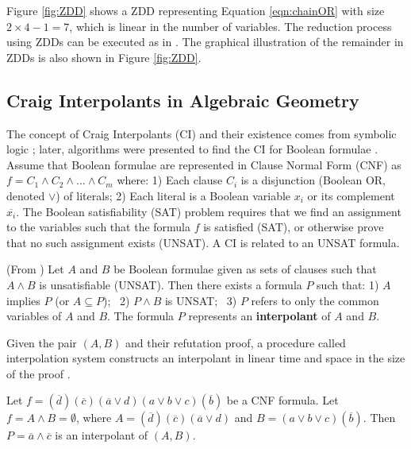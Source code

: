 Figure \ref{fig:ZDD} shows a ZDD representing 
Equation \ref{eqn:chainOR} with size $2\times4 -1 = 7$, which is linear in the number of variables.
The reduction process using ZDDs can be executed as in \cite{polybori:2009}. The graphical illustration 
of the remainder in ZDDs is also shown in Figure \ref{fig:ZDD}. 

\subsection{Craig Interpolants in Algebraic Geometry}
The concept of Craig Interpolants (CI) and their existence comes from
symbolic logic \cite{craig-interpolate}; later, algorithms were
presented to find the CI for Boolean formulae
\cite{pudlak:ci} \cite{mcmillan2003interpolation}. Assume that Boolean
formulae are represented in Clause Normal Form (CNF) as 
$f = C_1 \wedge C_2 \wedge \dots \wedge C_m$ where: 1) Each clause
$C_i$ is a disjunction (Boolean OR, denoted $\vee$) of literals; 2)
Each literal is a Boolean variable $x_i$ or its complement
$\overline{x_i}$. 
The Boolean satisfiability (SAT) problem requires that we find an
assignment to the variables such that the formula $f$ is satisfied
(SAT), or otherwise prove that no such assignment exists (UNSAT). 
A CI is related to an UNSAT formula. 

\begin{Definition}
(From \cite{mcmillan2003interpolation}) Let $A$ and $B$ be Boolean
  formulae given as sets of clauses such that $A \wedge B$ is
  unsatisfiable (UNSAT). Then there exists a formula $P$ such that: 
1) $A$ implies $P$ (or $A \subseteq P$); ~2) $P \wedge B$ is UNSAT; ~3)
$P$ refers to only the common variables of $A$ and $B$. The formula
$P$ represents an {\bf interpolant} of $A$ and $B$. 

Given  the pair $(A, B)$ and their refutation proof, a procedure
called interpolation system constructs an interpolant in linear time
and space in the size of the proof \cite{mcmillan2003interpolation}
\cite{pudlak:ci}. 
\end{Definition}

\begin{Example}\label{ex1}
Let $f = (\overline{d})(\overline{c})(\overline{a}\vee d)(a
\vee b \vee c)(\overline{b})$ be a CNF formula. Let $f = A \wedge B =
\emptyset$, where $A = (\overline{d})(\overline{c})(\overline{a}\vee
d)$ and  $B = (a \vee b \vee c)(\overline{b})$. Then $P = \overline{a}
\wedge \overline{c}$ is an interpolant of $(A, B)$. 
\end{Example}

